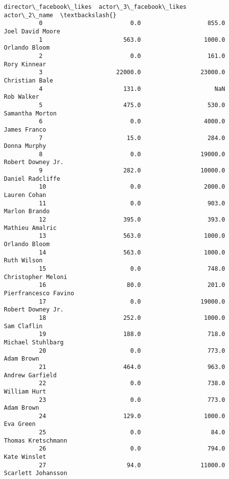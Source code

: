 \documentclass[11pt]{article}
\begin{document}
\begin{Verbatim}[commandchars=\\\{\}]
                director\_facebook\_likes  actor\_3\_facebook\_likes          actor\_2\_name  \textbackslash{}
          0                         0.0                   855.0      Joel David Moore   
          1                       563.0                  1000.0         Orlando Bloom   
          2                         0.0                   161.0          Rory Kinnear   
          3                     22000.0                 23000.0        Christian Bale   
          4                       131.0                     NaN            Rob Walker   
          5                       475.0                   530.0       Samantha Morton   
          6                         0.0                  4000.0          James Franco   
          7                        15.0                   284.0          Donna Murphy   
          8                         0.0                 19000.0     Robert Downey Jr.   
          9                       282.0                 10000.0      Daniel Radcliffe   
          10                        0.0                  2000.0          Lauren Cohan   
          11                        0.0                   903.0         Marlon Brando   
          12                      395.0                   393.0       Mathieu Amalric   
          13                      563.0                  1000.0         Orlando Bloom   
          14                      563.0                  1000.0           Ruth Wilson   
          15                        0.0                   748.0    Christopher Meloni   
          16                       80.0                   201.0  Pierfrancesco Favino   
          17                        0.0                 19000.0     Robert Downey Jr.   
          18                      252.0                  1000.0           Sam Claflin   
          19                      188.0                   718.0     Michael Stuhlbarg   
          20                        0.0                   773.0            Adam Brown   
          21                      464.0                   963.0       Andrew Garfield   
          22                        0.0                   738.0          William Hurt   
          23                        0.0                   773.0            Adam Brown   
          24                      129.0                  1000.0             Eva Green   
          25                        0.0                    84.0    Thomas Kretschmann   
          26                        0.0                   794.0          Kate Winslet   
          27                       94.0                 11000.0    Scarlett Johansson   

\end{Verbatim}
\end{document}
